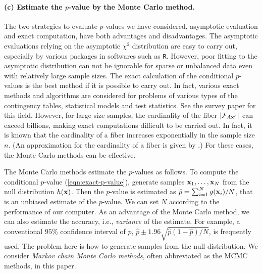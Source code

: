 \documentclass[12pt]{article}
\theoremstyle{definition}
\def\Bx{{\bf x}}
\begin{document}
\paragraph*{(c) Estimate the $p$-value by the Monte Carlo method.}
The two strategies to evaluate $p$-values we have considered, asymptotic
evaluation and exact computation, have both advantages and
disadvantages. The asymptotic evaluations relying on the asymptotic
$\chi^2$ distribution are easy to carry out, especially by various
packages in softwares such as \verb|R|. However, poor
fitting to the asymptotic distribution can not be ignorable for
sparse or unbalanced data even with relatively large sample sizes.
The exact calculation of the conditional $p$-values is the best method
if it is possible to carry out. 
In fact, various exact methods and algorithms are considered for
problems of various types of the contingency tables, statistical
models and test statistics. See the survey paper \cite{agresti-1992} for this
field. However, for large size samples, 
the cardinality of the fiber $|{\cal F}_{A\Bx^o}|$ can exceed billions,
making exact computations difficult to be carried out. 
In fact, it is known that the cardinality of a fiber increases
exponentially in the sample size $n$. (An approximation for the
cardinality of a fiber is given by \cite{Gail-Mantel}.)  
For these cases, the Monte Carlo methods can be effective.

The Monte Carlo methods estimate the $p$-values as follows. To compute
the conditional $p$-value (\ref{eqn:exact-p-value}), generate samples
$\Bx_1,\ldots,\Bx_N$ from the null distribution
$h(\Bx)$. Then the $p$-value is estimated as $\hat{p} = \sum_{i = 1}^N
g(\Bx_i) / N$, that is an unbiased estimate of the $p$-value. We can set
$N$ according to the performance of our computer. As an advantage of the
Monte Carlo method, we can also estimate the accuracy, i.e., {\it
variance} of the estimate. For example, a conventional $95\%$
confidence interval of $p$, $\hat{p} \pm
1.96\sqrt{\hat{p}(1-\hat{p})/N}$, is frequently used.  
The problem here is how to generate samples from the null
distribution. We consider {\it Markov chain Monte Carlo methods}, often
abbreviated as the MCMC methods, in this paper. 
\end{document}
